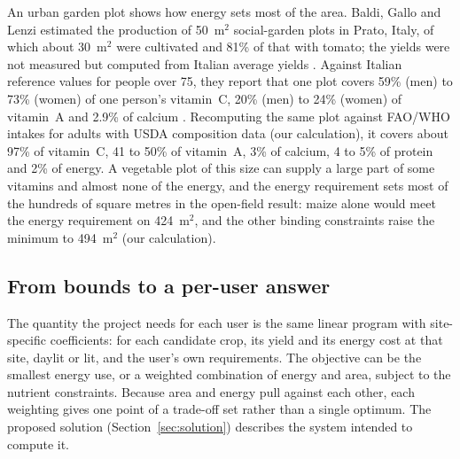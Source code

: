 An urban garden plot shows how energy sets most of the area. Baldi, Gallo and Lenzi estimated the production of 50~m$^2$ social-garden plots in Prato, Italy, of which about 30~m$^2$ were cultivated and 81\% of that with tomato; the yields were not measured but computed from Italian average yields \cite[pp.~2--3, 5--6; Fig.~4, p.~7]{baldi2024garden}. Against Italian reference values for people over 75, they report that one plot covers 59\% (men) to 73\% (women) of one person's vitamin~C, 20\% (men) to 24\% (women) of vitamin~A and 2.9\% of calcium \cite[Table~4, p.~9]{baldi2024garden}. Recomputing the same plot against FAO/WHO intakes for adults with USDA composition data (our calculation), it covers about 97\% of vitamin~C, 41 to 50\% of vitamin~A, 3\% of calcium, 4 to 5\% of protein and 2\% of energy. A vegetable plot of this size can supply a large part of some vitamins and almost none of the energy, and the energy requirement sets most of the hundreds of square metres in the open-field result: maize alone would meet the energy requirement on 424~m$^2$, and the other binding constraints raise the minimum to 494~m$^2$ (our calculation).

\subsection{From bounds to a per-user answer}\label{sec:nutrition-peruser}

The quantity the project needs for each user is the same linear program with site-specific coefficients: for each candidate crop, its yield and its energy cost at that site, daylit or lit, and the user's own requirements. The objective can be the smallest energy use, or a weighted combination of energy and area, subject to the nutrient constraints. Because area and energy pull against each other, each weighting gives one point of a trade-off set rather than a single optimum. The proposed solution (Section~\ref{sec:solution}) describes the system intended to compute it.%

